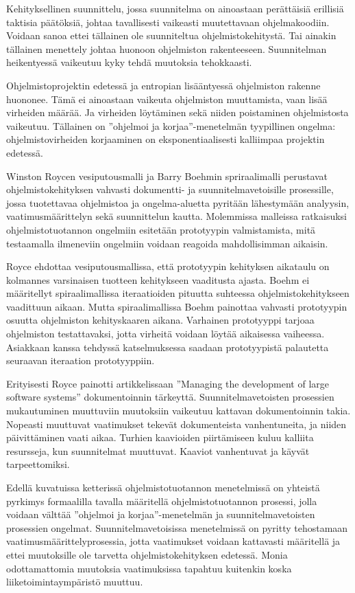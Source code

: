 \documentclass[finnish]{tktltiki2}
\theoremstyle{definition}
\theoremstyle{remark}
\begin{document}
Kehityksellinen suunnittelu, jossa suunnitelma on ainoastaan perättäisiä erillisiä taktisia päätöksiä, johtaa tavallisesti vaikeasti muutettavaan ohjelmakoodiin. Voidaan sanoa ettei tällainen ole suunniteltua ohjelmistokehitystä. Tai ainakin tällainen menettely johtaa huonoon ohjelmiston rakenteeseen. Suunnitelman heikentyessä vaikeutuu kyky tehdä muutoksia tehokkaasti\cite{FOW01b}. 

Ohjelmistoprojektin edetessä ja entropian lisääntyessä ohjelmiston rakenne huononee. Tämä ei ainoastaan vaikeuta ohjelmiston muuttamista, vaan lisää virheiden määrää. Ja virheiden löytäminen sekä niiden poistaminen ohjelmistosta vaikeutuu. Tällainen on ''ohjelmoi ja korjaa''-menetelmän tyypillinen ongelma: ohjelmistovirheiden korjaaminen on eksponentiaalisesti kalliimpaa projektin edetessä\cite{FOW01b}.

Winston Roycen vesiputousmalli\cite{ROY70} ja Barry Boehmin spriraalimalli\cite{BOE88} perustavat ohjelmistokehityksen vahvasti dokumentti- ja suunnitelmavetoisille prosessille, jossa tuotettavaa ohjelmistoa ja ongelma-aluetta pyritään lähestymään analyysin, vaatimusmäärittelyn sekä suunnittelun kautta. Molemmissa malleissa ratkaisuksi ohjelmistotuotannon ongelmiin esitetään prototyypin valmistamista, mitä testaamalla ilmeneviin ongelmiin voidaan reagoida mahdollisimman aikaisin.

Royce ehdottaa vesiputousmallissa, että prototyypin kehityksen aikataulu on kolmannes varsinaisen tuotteen kehitykseen vaaditusta ajasta\cite{ROY70}. Boehm ei määritellyt spiraalimallissa iteraatioiden pituutta suhteessa ohjelmistokehitykseen vaadittuun aikaan. Mutta spiraalimallissa Boehm painottaa vahvasti prototyypin osuutta ohjelmiston kehityskaaren aikana. Varhainen prototyyppi tarjoaa ohjelmiston testattavaksi, jotta virheitä voidaan löytää aikaisessa vaiheessa. Asiakkaan kanssa tehdyssä katselmuksessa saadaan prototyypistä palautetta seuraavan iteraation prototyyppiin\cite{BOE88}.

Erityisesti Royce painotti artikkelissaan ''Managing the development of large software systems'' dokumentoinnin tärkeyttä\cite{ROY70}. Suunnitelmavetoisten prosessien mukautuminen muuttuviin muutoksiin vaikeutuu kattavan dokumentoinnin takia. Nopeasti muuttuvat vaatimukset tekevät dokumenteista vanhentuneita, ja niiden päivittäminen vaati aikaa. Turhien kaavioiden piirtämiseen kuluu kalliita resursseja, kun suunnitelmat muuttuvat. Kaaviot vanhentuvat ja käyvät tarpeettomiksi\cite{FOW01b}.

Edellä kuvatuissa ketterissä ohjelmistotuotannon menetelmissä on yhteistä pyrkimys formaalilla tavalla määritellä ohjelmistotuotannon prosessi, jolla voidaan välttää ''ohjelmoi ja korjaa''-menetelmän ja suunnitelmavetoisten prosessien ongelmat. Suunnitelmavetoisissa menetelmissä on pyritty tehostamaan vaatimusmäärittelyprosessia, jotta vaatimukset voidaan kattavasti määritellä ja ettei muutoksille ole tarvetta ohjelmistokehityksen edetessä. Monia odottamattomia muutoksia vaatimuksissa tapahtuu kuitenkin koska liiketoimintaympäristö muuttuu\cite{FOW01b}.
\end{document}

